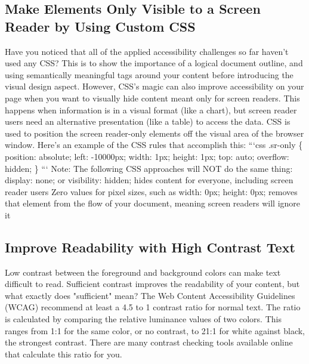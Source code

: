 \documentclass{article}%
\begin{document}
\subsection{Make Elements Only Visible to a Screen Reader by Using Custom CSS}%
\label{subsec:MakeElementsOnlyVisibletoaScreenReaderbyUsingCustomCSS}%
Have you noticed that all of the applied accessibility challenges so far haven't used any CSS? This is to show the importance of a logical document outline, and using semantically meaningful tags around your content before introducing the visual design aspect.\newline%
However, CSS's magic can also improve accessibility on your page when you want to visually hide content meant only for screen readers. This happens when information is in a visual format (like a chart), but screen reader users need an alternative presentation (like a table) to access the data. CSS is used to position the screen reader{-}only elements off the visual area of the browser window.\newline%
Here's an example of the CSS rules that accomplish this:\newline%
```css\newline%
.sr{-}only \{\newline%
  position: absolute;\newline%
  left: {-}10000px;\newline%
  width: 1px;\newline%
  height: 1px;\newline%
  top: auto;\newline%
  overflow: hidden;\newline%
\}\newline%
```\newline%
Note: The following CSS approaches will NOT do the same thing:\newline%
display: none; or visibility: hidden; hides content for everyone, including screen reader users\newline%
Zero values for pixel sizes, such as width: 0px; height: 0px; removes that element from the flow of your document, meaning screen readers will ignore it\newline%

%
\subsection{Improve Readability with High Contrast Text}%
\label{subsec:ImproveReadabilitywithHighContrastText}%
Low contrast between the foreground and background colors can make text difficult to read. Sufficient contrast improves the readability of your content, but what exactly does "sufficient" mean?\newline%
The Web Content Accessibility Guidelines (WCAG) recommend at least a 4.5 to 1 contrast ratio for normal text. The ratio is calculated by comparing the relative luminance values of two colors. This ranges from 1:1 for the same color, or no contrast, to 21:1 for white against black, the strongest contrast. There are many contrast checking tools available online that calculate this ratio for you.\newline%
\end{document}
